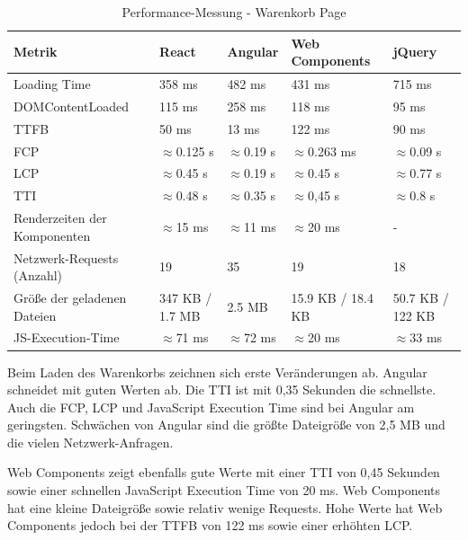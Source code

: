 \documentclass[oneside]{ausarbeitung}
\begin{document}
\begin{table}[H]
\centering
\caption{Performance-Messung - Warenkorb Page}
\begin{tabular}{|p{3.5cm}|p{2.5cm}|p{2.5cm}|p{2.5cm}|p{2.5cm}|}
\hline
\textbf{Metrik}                  & \textbf{React} & \textbf{Angular} & \textbf{Web Components} & \textbf{jQuery} \\ \hline
Loading Time                     & 358 ms        & 482 ms           & 431 ms                 & 715 ms          \\ \hline
DOMContentLoaded                 & 115 ms        & 258 ms           & 118 ms                 & 95 ms           \\ \hline
TTFB                             & 50 ms         & 13 ms            & 122 ms                 & 90 ms           \\ \hline
FCP                              & $\approx$0.125 s & $\approx$0.19 s & $\approx$0.263 ms      & $\approx$0.09 s \\ \hline
LCP                              & $\approx$0.45 s & $\approx$0.19 s & $\approx$0.45 s      & $\approx$0.77 s \\ \hline
TTI                              & $\approx$0.48 s & $\approx$0.35 s & $\approx$0,45 s        & $\approx$0.8 s \\ \hline
Renderzeiten der Komponenten     & $\approx$15 ms      & $\approx$11 ms            & $\approx$20 ms      & -           \\ \hline
Netzwerk-Requests (Anzahl)       & 19            & 35               & 19                     & 18              \\ \hline
Größe der geladenen Dateien      & 347 KB / 1.7 MB & 2.5 MB         & 15.9 KB / 18.4 KB      & 50.7 KB / 122 KB \\ \hline
JS-Execution-Time                & $\approx$71 ms & $\approx$72 ms          & $\approx$20 ms                 & $\approx$33 ms          \\ \hline
\end{tabular}
\end{table}

Beim Laden des Warenkorbs zeichnen sich erste Veränderungen ab. Angular schneidet mit guten Werten ab. Die TTI ist mit 0,35 Sekunden die schnellste. Auch die FCP, LCP und JavaScript Execution Time sind bei Angular am geringsten. Schwächen von Angular sind die größte Dateigröße von 2,5 MB und die vielen Netzwerk-Anfragen.

Web Components zeigt ebenfalls gute Werte mit einer TTI von 0,45 Sekunden sowie einer schnellen JavaScript Execution Time von 20 ms. Web Components hat eine kleine Dateigröße sowie relativ wenige Requests. Hohe Werte hat Web Components jedoch bei der TTFB von 122 ms sowie einer erhöhten LCP.
\end{document}
